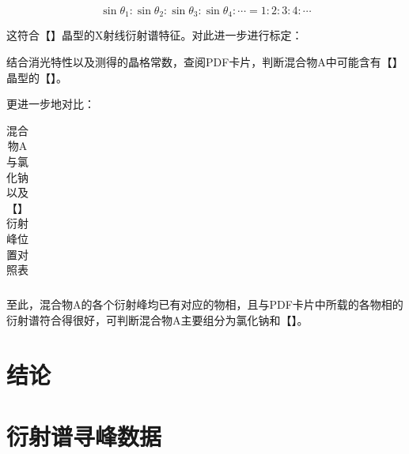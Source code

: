 \documentclass{thuemp}
\begin{document}
\begin{equation}
    \sin{\theta_1} : \sin{\theta_2} :\sin{\theta_3} : \sin{\theta_4} : \cdots = 1 : 2 : 3 : 4 : \cdots
    \label{eq:mixture_a_diff_patt}
\end{equation}

这符合【】晶型的X射线衍射谱特征。对此进一步进行标定：

结合消光特性以及测得的晶格常数，查阅PDF卡片，判断混合物A中可能含有【】晶型的【】。

更进一步地对比：

\begin{table}[H]
    \centering
    \captionnamefont{\wuhao\bf\heiti}
    \captiontitlefont{\wuhao\bf\heiti}
    \caption{混合物A与氯化钠以及【】衍射峰位置对照表}
    \label{tab:mixture_a_unknow_peaks}
    \liuhao
    \begin{tabular}{ccccc}
        \toprule
        \midrule
        \bottomrule
    \end{tabular}
\end{table}

至此，混合物A的各个衍射峰均已有对应的物相，且与PDF卡片中所载的各物相的衍射谱符合得很好，可判断混合物A主要组分为氯化钠和【】。

\section{结论}



\renewcommand\refname{\heiti\wuhao\centerline{参考文献}\global\def\refname{参考文献}}
\vskip 12pt


\let\OLDthebibliography\thebibliography
\renewcommand\thebibliography[1]{
  \OLDthebibliography{#1}
  \setlength{\parskip}{0pt}
  \setlength{\itemsep}{0pt plus 0.3ex}
}

{
\renewcommand{\baselinestretch}{0.9}
\liuhao


}

\appendix
\section{衍射谱寻峰数据}
\end{document}
